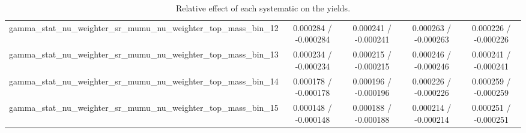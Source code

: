 \documentclass[10pt]{article}
\begin{document}
\begin{table}[htbp]
\begin{center}
\begin{tabular}{|c|c|c|c|c|}
  gamma_stat_nu_weighter_sr_mumu_nu_weighter_top_mass_bin_12 & 0.000284 / -0.000284 & 0.000241 / -0.000241 & 0.000263 / -0.000263 & 0.000226 / -0.000226 \\ 
  gamma_stat_nu_weighter_sr_mumu_nu_weighter_top_mass_bin_13 & 0.000234 / -0.000234 & 0.000215 / -0.000215 & 0.000246 / -0.000246 & 0.000241 / -0.000241 \\ 
  gamma_stat_nu_weighter_sr_mumu_nu_weighter_top_mass_bin_14 & 0.000178 / -0.000178 & 0.000196 / -0.000196 & 0.000226 / -0.000226 & 0.000259 / -0.000259 \\ 
  gamma_stat_nu_weighter_sr_mumu_nu_weighter_top_mass_bin_15 & 0.000148 / -0.000148 & 0.000188 / -0.000188 & 0.000214 / -0.000214 & 0.000251 / -0.000251 \\ 
\hline 
\end{tabular} 
\caption{Relative effect of each systematic on the yields.} 
\end{center} 
\end{table} 
\end{document}
